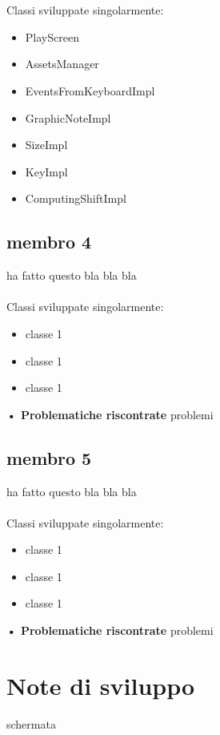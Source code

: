 \documentclass[a4paper,12pt]{report}
\begin{document}
\\ \\
Classi sviluppate singolarmente:
{
	\begin{itemize}
		\item PlayScreen
		\item AssetsManager
		\item EventsFromKeyboardImpl
		\item GraphicNoteImpl
		\item SizeImpl
		\item KeyImpl
		\item ComputingShiftImpl
	\end{itemize}
}
\hfill\break

\subsection{membro 4}
ha fatto questo bla bla bla \\ \\
Classi sviluppate singolarmente:
{
	\begin{itemize}
		\item classe 1
		\item classe 1
		\item classe 1
	\end{itemize}
}
\hfill\break
\textbf{• Problematiche riscontrate}\hfill\break
problemi 
\newpage

\subsection{membro 5}
ha fatto questo bla bla bla \\ \\
Classi sviluppate singolarmente:
{
	\begin{itemize}
		\item classe 1
		\item classe 1
		\item classe 1
	\end{itemize}
}
\hfill\break
\textbf{• Problematiche riscontrate}\hfill\break
problemi 
\newpage



\section{Note di sviluppo}
schermata
\newpage
\end{document}
